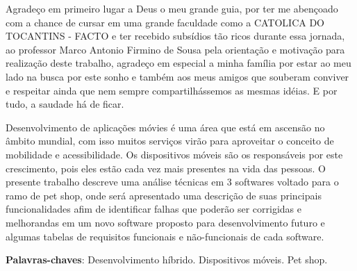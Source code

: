 \documentclass[12pt,openright,twoside,a4paper,english,french,spanish,brazil]{abntex2}
\begin{document}
\frenchspacing 


\imprimircapa

\imprimirfolhaderosto*


\begin{agradecimentos}
Agradeço em primeiro lugar a Deus o meu grande guia, por ter me abençoado com a chance de cursar em uma grande faculdade como a CATOLICA DO TOCANTINS - FACTO e ter recebido subsídios tão ricos durante essa jornada, ao professor Marco Antonio Firmino de Sousa pela orientação e motivação para realização deste trabalho, agradeço em especial a minha família por estar ao meu lado na busca por este sonho e também aos meus amigos que souberam conviver e respeitar ainda que nem sempre compartilhássemos as mesmas idéias. E por tudo, a saudade há de ficar.

\end{agradecimentos}

\begin{resumo}
Desenvolvimento de aplicações móvies é uma área que está em ascensão no âmbito mundial, com isso muitos serviços virão para aproveitar o conceito de mobilidade e acessibilidade. Os dispositivos móveis são os responsáveis por este crescimento, pois eles estão cada vez mais presentes na vida das pessoas. O presente trabalho descreve uma análise técnicas em 3 softwares voltado para o ramo de pet shop, onde será apresentado uma descrição de suas principais funcionalidades afim de identificar falhas que poderão ser corrigidas e melhorandas em um novo software proposto para desenvolvimento futuro e algumas tabelas de requisitos funcionais e não-funcionais de cada software.


 \vspace{\onelineskip}
    
 \noindent
 \textbf{Palavras-chaves}: Desenvolvimento híbrido. Dispositivos  móveis. Pet shop.
\end{resumo}
\end{document}
